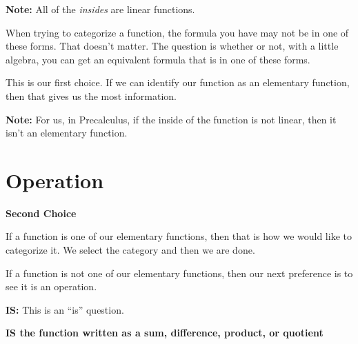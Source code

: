 \documentclass{ximera}
\begin{document}
\textbf{Note:} All of the \textit{insides} are linear functions. 


When trying to categorize a function, the formula you have may not be in one of these forms.  That doesn't matter.  The question is whether or not, with a little algebra, you can get an equivalent formula that is in one of these forms. 


This is our first choice.  If we can identify our function as an elementary function, then that gives us the most information. 


\textbf{Note:} For us, in Precalculus, if the inside of the function is not linear, then it isn't an elementary function. 







































\section*{Operation}

\textbf{\textcolor{purple!85!blue}{Second Choice}} 


If a function is one of our elementary functions, then that is how we would like to categorize it. We select the category and then we are done.

If a function is not one of our elementary functions, then our next preference is to see it is an operation.

\textbf{\textcolor{purple!70!blue}{IS:}}   This is an ``is'' question. 

\begin{center}
\textbf{\textcolor{red!80!black}{IS the function written as a sum, difference, product, or quotient}}

\end{center}
\end{document}
